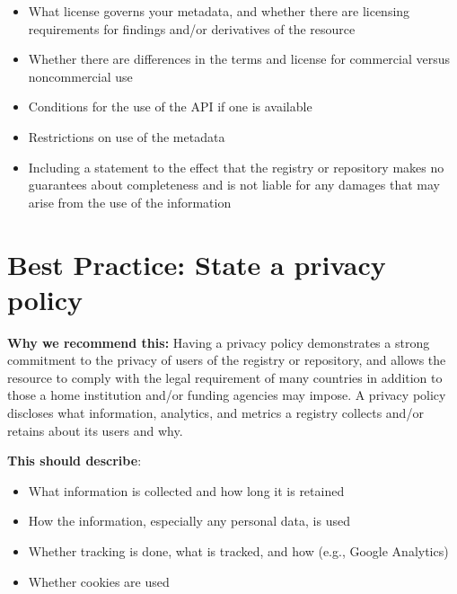 \documentclass[11pt]{article}
\begin{document}
\begin{itemize}
\item What license governs your metadata, and whether there are licensing requirements for findings and/or derivatives of the resource

\item Whether there are differences in the terms and license for commercial versus noncommercial use

\item Conditions for the use of the API if one is available 

\item Restrictions on use of the metadata

\item Including a statement to the effect that the registry or repository makes no guarantees about completeness and is not liable for any damages that may arise from the use of the information

\end{itemize}


\section{Best Practice: State a privacy policy}
\label{best-practice-state-a-privacy-policy}

\textbf{Why we recommend this:} Having a privacy policy demonstrates a strong commitment to the privacy of users of the registry or repository, and allows the resource to comply with the legal requirement of many countries in addition to those a home institution and/or funding agencies may impose. A privacy policy discloses what information, analytics, and metrics a registry collects and/or retains about its users and why.

\textbf{This should describe}:

\begin{itemize}
\item What information is collected and how long it is retained

\item How the information, especially any personal data, is used

\item Whether tracking is done, what is tracked, and how (e.g., Google Analytics)

\item Whether cookies are used

\end{itemize}
\end{document}
